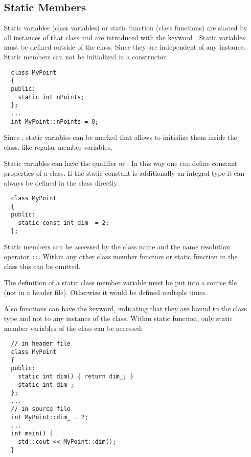 \subsection{Static Members}
Static variables (class variables) or static function (class functions) are shared by all instances of that class and are introduced with the keyword .
Static variables must be defined outside of the class. Since they are independent of any instance. Static members can not be initialized in a constructor.
%
\begin{verbatim}
  class MyPoint
  {
  public:
    static int nPoints;
  };
  ...
  int MyPoint::nPoints = 0;
\end{verbatim}

Since \marginpar{[\cxx{17}]}, static variables can be marked  that allows to initialize them inside the class, like regular member
variables, \eg {}

Static variables can have the qualifier  or . In this way one can define constant properties of a class. If the static
constant is additionally an integral type it can always be defined in the class directly:
%
\begin{verbatim}
  class MyPoint
  {
  public:
    static const int dim_ = 2;
  };
\end{verbatim}

Static members can be accessed by the class name and the name resolution operator \texttt{::}. Within any other class member function or static function in the
class this can be omitted.

\begin{rem}
  The definition of a static class member variable must be put into a source file (not in a header file). Otherwise it would be defined multiple times.
\end{rem}

Also functions can have the  keyword, indicating that they are bound to the class type and not to any instance of the class. Within static
function, only static member variables of the class can be accessed:
%
\begin{verbatim}
  // in header file
  class MyPoint
  {
  public:
    static int dim() { return dim_; }
    static int dim_;
  };
  ...
  // in source file
  int MyPoint::dim_ = 2;
  ...
  int main() {
    std::cout << MyPoint::dim();
  }
\end{verbatim}

